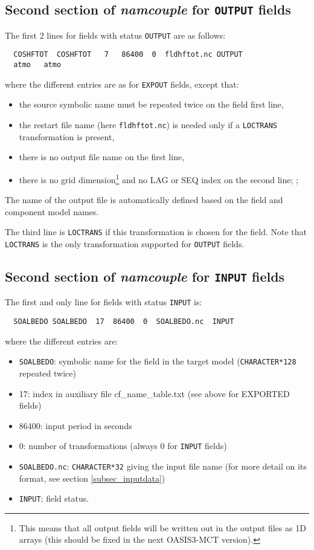 \subsection{Second section of {\it namcouple} for {\tt OUTPUT} fields}
\label{subsubsec_secondOUTPUT}
The first 2 lines for fields with status {\tt OUTPUT} are as follows:
  \begin{verbatim}
  COSHFTOT  COSHFTOT   7   86400  0  fldhftot.nc OUTPUT 
  atmo   atmo 
\end{verbatim}
where the different entries are as for {\tt EXPOUT} fields, except
that:
\begin{itemize}
\item the source symbolic name must be repeated twice on the field
  first line,
\item the restart file name (here {\tt fldhftot.nc}) is needed only if
  a {\tt LOCTRANS} transformation is present,
\item there is no output file name on the first line,
\item there is no grid dimension\footnote{This means that all output
    fields will be written out in the output files as 1D arrays (this
    should be fixed in the next OASIS3-MCT version).} and no LAG or SEQ
  index on the second line; ;
\end{itemize}
The name of the output file is automatically defined based on the
field and component model names.

The third line is {\tt LOCTRANS} if this transformation is chosen for
the field. Note that {\tt LOCTRANS} is the only transformation
supported for {\tt OUTPUT} fields.

\subsection{Second section of {\it namcouple} for {\tt INPUT} fields}
\label{subsubsec_secondINPUT}

The first and only line for fields with status {\tt INPUT} is:

  \begin{verbatim}
  SOALBEDO SOALBEDO  17  86400  0  SOALBEDO.nc  INPUT
  \end{verbatim}
\vspace{-0.5cm}
where the different entries are:
\begin{itemize}
\item {\tt SOALBEDO}: symbolic name for the field in the target model
  ({\tt CHARACTER*128} repeated twice)
\item 17: index in auxiliary file cf\_name\_table.txt (see above for
  EXPORTED fields)
\item 86400: input period in seconds
\item 0: number of transformations (always 0 for {\tt INPUT} fields)
\item {\tt SOALBEDO.nc}: {\tt CHARACTER*32} giving the input file name
  (for more detail on its format, see section \ref{subsec_inputdata})
\item {\tt INPUT}: field status.
\end{itemize}


